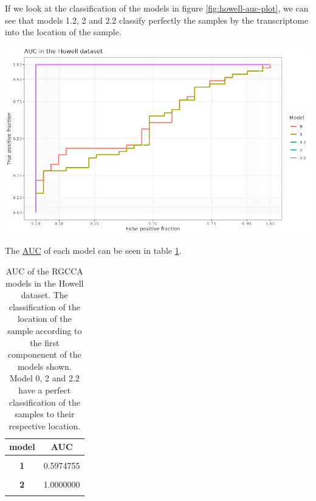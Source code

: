 \documentclass[
  12pt,
  a4paper,
  twoside,
  openright]{book}
\let\origfigure\figure
\let\endorigfigure\endfigure
\renewenvironment{figure}[1][2] {
    \expandafter\origfigure\expandafter[!htbp]
} {
    \endorigfigure
}
\begin{document}
If we look at the classification of the models in figure \ref{fig:howell-auc-plot}, we can see that models 1.2, 2 and 2.2 classify perfectly the samples by the transcriptome into the location of the sample.

\begin{figure}
\includegraphics[width=1\linewidth]{images/howell-rgcca-auc} \caption[AUC of the RGCCA models in the Howell dataset.]{AUC of the RGCCA models in the Howell dataset. The classification of the localization of the sample according to the first component of the gene expression of the models generated with RGCCA on the Howell dataset.}\label{fig:howell-auc-plot}
\end{figure}

The \protect\hyperlink{acronyms_AUC}{AUC} of each model can be seen in table \ref{tab:howell-auc}.

\begin{table}[H]

\caption[AUC of the RGCCA models in the Howell dataset]{\label{tab:howell-auc}AUC of the RGCCA models in the Howell dataset. The classification of the location of the sample according to the first componenent of the models shown. Model 0, 2 and 2.2 have a perfect classification of the samples to their respective location.}
\centering
\begin{tabular}[t]{>{}c|c}
\hline
\textbf{model} & \textbf{AUC}\\
\hline
\textbf{\cellcolor{gray!6}{0}} & \cellcolor{gray!6}{0.6255259}\\
\hline
\textbf{1} & 0.5974755\\
\hline
\textbf{\cellcolor{gray!6}{1.2}} & \cellcolor{gray!6}{1.0000000}\\
\hline
\textbf{2} & 1.0000000\\
\hline
\textbf{\cellcolor{gray!6}{2.2}} & \cellcolor{gray!6}{1.0000000}\\
\hline
\end{tabular}
\end{table}
\end{document}
